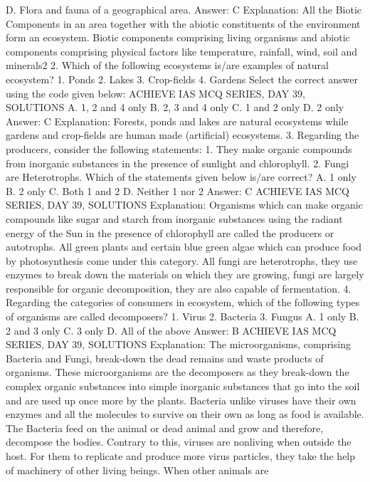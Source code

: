 D. Flora and fauna of a geographical area.
Answer: C
Explanation: All the Biotic Components in an area together with the
abiotic constituents of the environment form an ecosystem. Biotic
components comprising living organisms and abiotic components
comprising physical factors like temperature, rainfall, wind, soil and
minerals2
2. Which of the following ecosystems is/are examples of natural
ecosystem?
1. Ponds
2. Lakes
3. Crop-fields
4. Gardens
Select the correct answer using the code given below:
ACHIEVE IAS MCQ SERIES, DAY 39, SOLUTIONS
A. 1, 2 and 4 only
B. 2, 3 and 4 only
C. 1 and 2 only
D. 2 only
Answer: C
Explanation: Forests, ponds and lakes are natural ecosystems while
gardens and crop-fields are human made (artificial) ecosystems.
3. Regarding the producers, consider the following statements:
1. They make organic compounds from inorganic substances in the
presence of sunlight and chlorophyll.
2. Fungi are Heterotrophs.
Which of the statements given below is/are correct?
A. 1 only
B. 2 only
C. Both 1 and 2
D. Neither 1 nor 2
Answer: C
ACHIEVE IAS MCQ SERIES, DAY 39, SOLUTIONS
Explanation: Organisms which can make organic compounds like
sugar and starch from inorganic substances using the radiant energy
of the Sun in the presence of chlorophyll are called the producers or
autotrophs.
All green plants and certain blue green algae which can produce food
by photosynthesis come under this category.
All fungi are heterotrophs, they use enzymes to break down the
materials on which they are growing, fungi are largely responsible
for organic decomposition, they are also capable of fermentation.
4. Regarding the categories of consumers in ecosystem, which of
the following types of organisms are called decomposers?
1. Virus
2. Bacteria
3. Fungus
A. 1 only
B. 2 and 3 only
C. 3 only
D. All of the above
Answer: B
ACHIEVE IAS MCQ SERIES, DAY 39, SOLUTIONS
Explanation: The microorganisms, comprising Bacteria and Fungi,
break-down the dead remains and waste products of
organisms. These microorganisms are the decomposers as they
break-down the complex organic substances into simple inorganic
substances that go into the soil and are used up once more by the
plants. Bacteria unlike viruses have their own enzymes and all the
molecules to survive on their own as long as food is available. The
Bacteria feed on the animal or dead animal and grow and therefore,
decompose the bodies.
Contrary to this, viruses are nonliving when outside the host. For
them to replicate and produce more virus particles, they take the
help of machinery of other living beings. When other animals are

